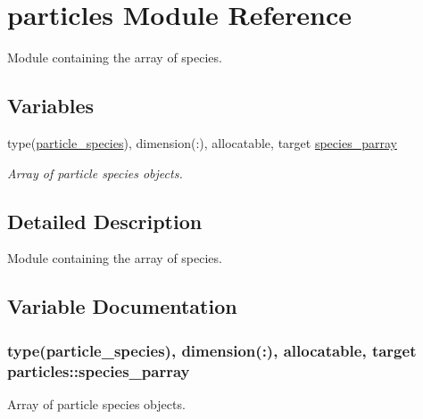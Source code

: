 \hypertarget{namespaceparticles}{}\section{particles Module Reference}
\label{namespaceparticles}


Module containing the array of species.  


\subsection*{Variables}
\begin{DoxyCompactItemize}
\item 
type(\hyperlink{structparticle__speciesmodule_1_1particle__species}{particle\+\_\+species}), dimension(\+:), allocatable, target \hyperlink{namespaceparticles_ab5efcd7db2bd15deeba572ac268eef8e}{species\+\_\+parray}
\begin{DoxyCompactList}\small\item\em Array of particle species objects. \end{DoxyCompactList}\end{DoxyCompactItemize}


\subsection{Detailed Description}
Module containing the array of species. 

\subsection{Variable Documentation}
\subsubsection[{\texorpdfstring{species\+\_\+parray}{species_parray}}]{\setlength{\rightskip}{0pt plus 5cm}type({\bf particle\+\_\+species}), dimension(\+:), allocatable, target particles\+::species\+\_\+parray}\hypertarget{namespaceparticles_ab5efcd7db2bd15deeba572ac268eef8e}{}\label{namespaceparticles_ab5efcd7db2bd15deeba572ac268eef8e}


Array of particle species objects. 

